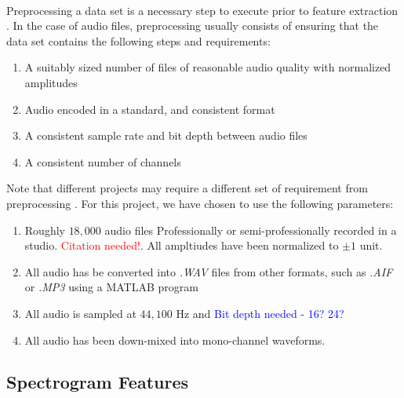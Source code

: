 \documentclass[12pt,letterpaper]{article}
\begin{document}
\paragraph*{}Preprocessing a data set is a necessary step to execute prior to feature extraction \cite{Geron2,James,Serizel}. In the case of audio files, preprocessing usually consists of ensuring that the data set contains the following steps and requirements:
\begin{enumerate}
\item A suitably sized number of files of reasonable audio quality with normalized amplitudes
\item Audio encoded in a standard, and consistent format
\item A consistent sample rate and bit depth between audio files
\item A consistent number of channels
\end{enumerate}
Note that different projects may require a different set of requirement from preprocessing \cite{Virtanen}. For this project, we have chosen to use the following parameters:
\begin{enumerate}
\item Roughly $18,000$ audio files Professionally or semi-professionally recorded in a studio. \textcolor{red}{Citation needed!}. All ampltiudes have been normalized to $\pm 1$ unit.
\item All audio has be converted into \textit{.WAV} files from other formats, such as \textit{.AIF} or \textit{.MP3} using a MATLAB program
\item All audio is sampled at $44,100$ Hz and \textcolor{blue}{Bit depth needed - 16? 24?}
\item All audio has been down-mixed into mono-channel waveforms.
\end{enumerate}


\newpage

\subsection{Spectrogram Features}
\label{subsec-Spectrogram}
\end{document}
